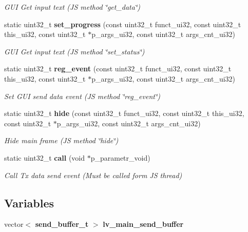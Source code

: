 \begin{DoxyCompactItemize}
\begin{DoxyCompactList}\small\item\em G\+UI Get input text (JS method \char`\"{}get\+\_\+data\char`\"{}) \end{DoxyCompactList}\item 
static uint32\+\_\+t \textbf{ set\+\_\+progress} (const uint32\+\_\+t funct\+\_\+ui32, const uint32\+\_\+t this\+\_\+ui32, const uint32\+\_\+t $\ast$p\+\_\+args\+\_\+ui32, const uint32\+\_\+t args\+\_\+cnt\+\_\+ui32)
\begin{DoxyCompactList}\small\item\em G\+UI Get input text (JS method \char`\"{}set\+\_\+status\char`\"{}) \end{DoxyCompactList}\item 
static uint32\+\_\+t \textbf{ reg\+\_\+event} (const uint32\+\_\+t funct\+\_\+ui32, const uint32\+\_\+t this\+\_\+ui32, const uint32\+\_\+t $\ast$p\+\_\+args\+\_\+ui32, const uint32\+\_\+t args\+\_\+cnt\+\_\+ui32)
\begin{DoxyCompactList}\small\item\em Set G\+UI send data event (JS method \char`\"{}reg\+\_\+event\char`\"{}) \end{DoxyCompactList}\item 
static uint32\+\_\+t \textbf{ hide} (const uint32\+\_\+t funct\+\_\+ui32, const uint32\+\_\+t this\+\_\+ui32, const uint32\+\_\+t $\ast$p\+\_\+args\+\_\+ui32, const uint32\+\_\+t args\+\_\+cnt\+\_\+ui32)
\begin{DoxyCompactList}\small\item\em Hide main frame (JS method \char`\"{}hide\char`\"{}) \end{DoxyCompactList}\item 
static uint32\+\_\+t \textbf{ call} (void $\ast$p\+\_\+parametr\+\_\+void)
\begin{DoxyCompactList}\small\item\em Call Tx data send event (Must be called form JS thread) \end{DoxyCompactList}\end{DoxyCompactItemize}
\subsection*{Variables}
\begin{DoxyCompactItemize}
\item 
vector$<$ \textbf{ send\+\_\+buffer\+\_\+t} $>$ \textbf{ lv\+\_\+main\+\_\+send\+\_\+buffer}
\end{DoxyCompactItemize}


